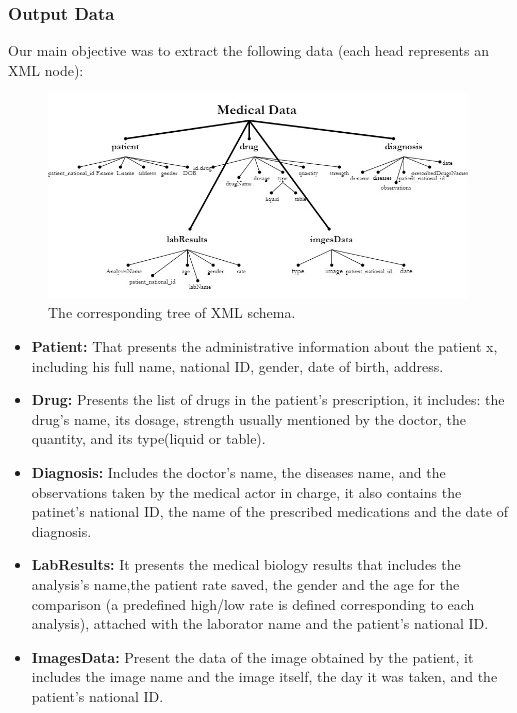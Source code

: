 \subsubsection*{Output Data}
Our main objective was to extract the following data (each head represents an XML node):
\begin{figure}[h!]
  \center
  \includegraphics[width=0.99\textwidth]{images/chapter3/tree.jpg}
  \caption{The corresponding tree of XML schema.}
  \label{fig:xmlschema}
\end{figure}
\begin{itemize}
\renewcommand{\labelitemi}{$\bullet$}
\item \textbf{Patient:} That presents the administrative information about the patient x, including his full name, national ID, gender, date of birth, address. 
\item \textbf{Drug:} Presents the list of drugs in the patient’s  prescription, it includes: the drug’s name, its dosage, strength usually mentioned by the doctor, the quantity, and its type(liquid or table).
\item \textbf{Diagnosis:} Includes the doctor's name, the diseases name, and the observations taken by the medical actor in charge, it also contains the patinet's national ID, the name of the prescribed medications and the date of diagnosis. 
\item \textbf{LabResults:} It presents the medical biology results that includes the analysis’s name,the patient rate saved, the gender and the age for the comparison (a predefined high/low rate is defined corresponding to each analysis), attached with the laborator name and the patient's national ID.
\item \textbf{ImagesData:} Present the data of the image obtained by the patient, it includes the image name and the image itself, the day it was taken, and the patient's national ID.
\end{itemize}

